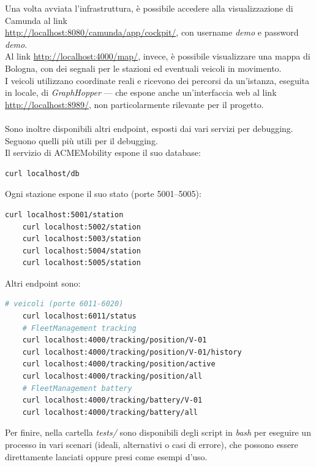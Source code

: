Una volta avviata l'infrastruttura, è possibile accedere alla visualizzazione di
Camunda al link \\
\mbox{\url{http://localhost:8080/camunda/app/cockpit/}}, con username
\textit{demo} e password \textit{demo}.\\
Al link \mbox{\url{http://localhost:4000/map/}}, invece, è possibile
visualizzare una mappa di Bologna, con dei segnali per le stazioni ed eventuali
veicoli in movimento.\\
I veicoli utilizzano coordinate reali e ricevono dei percorsi da un'istanza,
eseguita in locale, di \textit{GraphHopper} --- che espone anche un'interfaccia
web al link \mbox{\url{http://localhost:8989/}}, non particolarmente rilevante
per il progetto.\\
\\
Sono inoltre disponibili altri endpoint, esposti dai vari servizi per
debugging. Seguono quelli più utili per il debugging.\\

Il servizio di ACMEMobility espone il suo database:  
\begin{lstlisting}[language=Bash]
	curl localhost/db
\end{lstlisting}

Ogni stazione espone il suo stato (porte 5001--5005):
\begin{lstlisting}[language=Bash]
	curl localhost:5001/station
	curl localhost:5002/station
	curl localhost:5003/station
	curl localhost:5004/station
	curl localhost:5005/station
\end{lstlisting}

Altri endpoint sono:
\begin{lstlisting}[language=Bash]
	# veicoli (porte 6011-6020)
	curl localhost:6011/status
	# FleetManagement tracking
	curl localhost:4000/tracking/position/V-01
	curl localhost:4000/tracking/position/V-01/history
	curl localhost:4000/tracking/position/active
	curl localhost:4000/tracking/position/all
	# FleetManagement battery
	curl localhost:4000/tracking/battery/V-01
	curl localhost:4000/tracking/battery/all
\end{lstlisting}

Per finire, nella cartella \textit{tests/} sono disponibili degli script in
\textit{bash} per eseguire un processo in vari scenari (ideali, alternativi o
casi di errore), che possono essere direttamente lanciati oppure presi come
esempi d'uso.